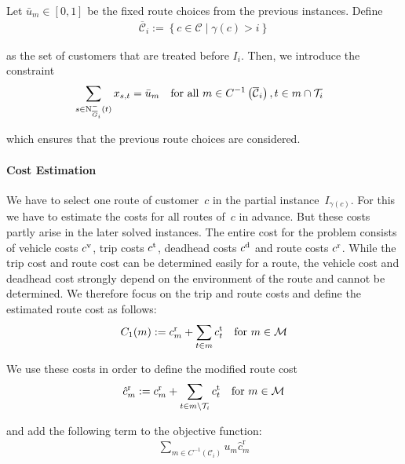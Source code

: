 Let $\bar{u}_m\in[0,1]$ be the fixed route choices from the previous instances. Define
\begin{align*}
	\overline{\mathcal{C}}_i := \left\{c\in\mathcal{C}\mid \gamma\left(c\right)>i\right\}
\end{align*}

as the set of customers that are treated before $I_i$. Then, we introduce the constraint
\begin{align}
	&\sum_{s\in\operatorname{N}_{\overline{G}_i}^-(t)} x_{s,t} = \bar{u}_m && \text{for all } m\in C^{-1}\left(\overline{\mathcal{C}}_i\right), t\in m\cap\mathcal{T}_i \label{eq:TMILP:route_fix}
\end{align}

which ensures that the previous route choices are considered.

\paragraph{Cost Estimation} \parfill

We have to select one route of customer~$c$ in the partial instance~$I_{\gamma(c)}$. For this we have to estimate the costs for all routes of~$c$ in advance. But these costs partly arise in the later solved instances. The entire cost for the problem consists of vehicle costs $c^{\operatorname{v}}$, trip costs $c^{\operatorname{t}}$, deadhead costs $c^{\operatorname{d}}$ and route costs $c^{\operatorname{r}}$. While the trip cost and route cost can be determined easily for a route, the vehicle cost and deadhead cost strongly depend on the environment of the route and cannot be determined. We therefore focus on the trip and route costs and define the estimated route cost as follows:
\begin{align*}
	C_1(m) := c^{\operatorname{r}}_m + \sum_{t\in m}c^{\operatorname{t}}_t && \text{for } m\in\mathcal{M}
\end{align*}

We use these costs in order to define the modified route cost
\begin{align*}
	\hat{c}^{\operatorname{r}}_m := c^{\operatorname{r}}_m + \sum_{t\in m\backslash\mathcal{T}_i}c^{\operatorname{t}}_t && \text{for } m\in\mathcal{M}
\end{align*}

and add the following term to the objective function:
\begin{align*}
	\sum_{m\in C^{-1}\left(\mathcal{C}_i\right)} u_m \hat{c}^{\operatorname{r}}_m
\end{align*}

